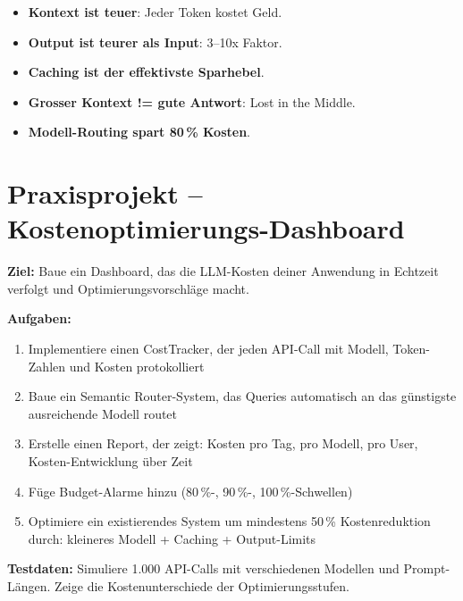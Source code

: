 \begin{merke}
\begin{itemize}
    \item \textbf{Kontext ist teuer}: Jeder Token kostet Geld.
    \item \textbf{Output ist teurer als Input}: 3--10x Faktor.
    \item \textbf{Caching ist der effektivste Sparhebel}.
    \item \textbf{Grosser Kontext != gute Antwort}: Lost in the Middle.
    \item \textbf{Modell-Routing spart 80\,\% Kosten}.
\end{itemize}
\end{merke}

\section{Praxisprojekt -- Kostenoptimierungs-Dashboard}

\textbf{Ziel:} Baue ein Dashboard, das die LLM-Kosten deiner Anwendung
in Echtzeit verfolgt und Optimierungsvorschläge macht.

\textbf{Aufgaben:}
\begin{enumerate}[leftmargin=*]
    \item Implementiere einen CostTracker, der jeden API-Call mit
    Modell, Token-Zahlen und Kosten protokolliert
    \item Baue ein Semantic Router-System, das Queries automatisch
    an das günstigste ausreichende Modell routet
    \item Erstelle einen Report, der zeigt: Kosten pro Tag, pro Modell,
    pro User, Kosten-Entwicklung über Zeit
    \item Füge Budget-Alarme hinzu (80\,\%-, 90\,\%-, 100\,\%-Schwellen)
    \item Optimiere ein existierendes System um mindestens 50\,\%
    Kostenreduktion durch: kleineres Modell + Caching + Output-Limits
\end{enumerate}

\textbf{Testdaten:} Simuliere 1.000 API-Calls mit verschiedenen Modellen
und Prompt-Längen. Zeige die Kostenunterschiede der Optimierungsstufen.


